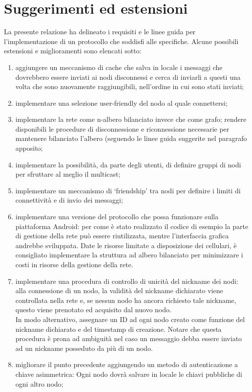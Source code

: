 \documentclass[10pt]{article} %
\begin{document}
\newpage
\section{Suggerimenti ed estensioni}
La presente relazione ha delineato i requisiti e le linee guida per l'implementazione di un protocollo che soddisfi alle specifiche. Alcune possibili estensioni e miglioramenti sono elencati sotto:
\begin{enumerate}
	\item aggiungere un meccanismo di cache che salva in locale i messaggi che dovrebbero essere inviati ai nodi disconnessi e cerca di inviarli a questi una volta che sono nuovamente raggiungibili, nell'ordine in cui sono stati inviati;
	\item implementare una selezione user-friendly del nodo al quale connettersi;
	\item implementare la rete come n-albero bilanciato invece che come grafo; rendere disponibili le procedure di disconnessione e riconnessione necessarie per mantenere bilanciato l'albero (seguendo le linee guida suggerite nel paragrafo apposito;
	\item implementare la possibilità, da parte degli utenti, di definire gruppi di nodi per sfruttare al meglio il multicast;
	\item implementare un meccanismo di `friendship' tra nodi per definire i limiti di connettività e di invio dei messaggi;
	\item implementare una versione del protocollo che possa funzionare sulla piattaforma Android: per come è stato realizzato il codice di esempio la parte di gestione della rete può essere riutilizzata, mentre l'interfaccia grafica andrebbe sviluppata. Date le risorse limitate a disposizione dei cellulari, è consigliato implementare la struttura ad albero bilanciato per minimizzare i costi in risorse della gestione della rete.
	\item implementare una procedura di controllo di unicità del nickname dei nodi: alla connessione di un nodo, la validità del nickname dichiarato viene controllata nella rete e, se nessun nodo ha ancora richiesto tale nickname, questo viene prenotato ed acquisito dal nuovo nodo. \\
	In modo alternativo, assegnare un ID ad ogni nodo creato come funzione del nickname dichiarato e del timestamp di creazione. Notare che questa procedura è prona ad ambiguità nel caso un messaggio debba essere inviato ad un nickname posseduto da più di un nodo.
	\item migliorare il punto precedente aggiungendo un metodo di autenticazione a chiave asimmetrica: Ogni nodo dovrà salvare in locale le chiavi pubbliche di ogni altro nodo;

\end{enumerate}
\end{document}
